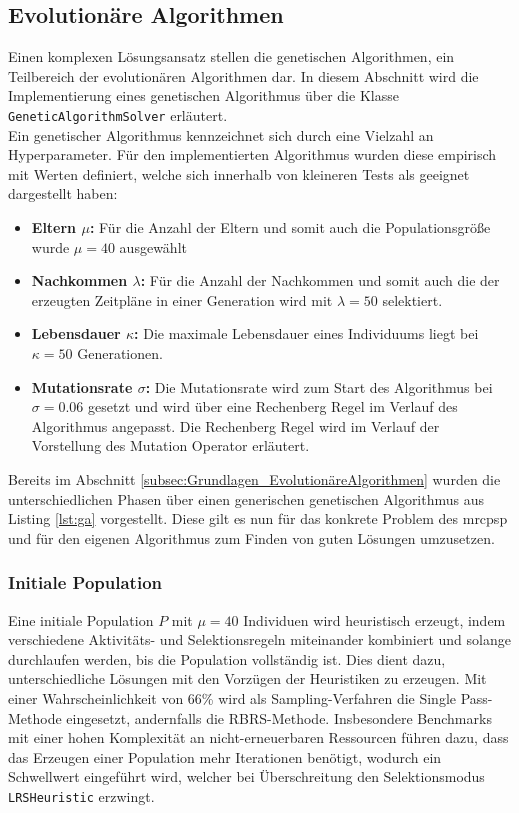 \subsection{Evolutionäre Algorithmen} \label{subsec:MetaheuristischeAlgorithmen_EvolutionaereAlgorithmen}

Einen komplexen Lösungsansatz stellen die genetischen Algorithmen, ein Teilbereich der evolutionären Algorithmen dar. In diesem Abschnitt wird die Implementierung eines genetischen Algorithmus über die Klasse \lstinline|GeneticAlgorithmSolver| erläutert. \\

Ein genetischer Algorithmus kennzeichnet sich durch eine Vielzahl an Hyperparameter. Für den implementierten Algorithmus wurden diese empirisch mit Werten definiert, welche sich innerhalb von kleineren Tests als geeignet dargestellt haben: 

\begin{itemize}
    \item \textbf{Eltern $\mu$: } Für die Anzahl der Eltern und somit auch die Populationsgröße wurde  $\mu = 40$ ausgewählt
    \item \textbf{Nachkommen $\lambda$: } Für die Anzahl der Nachkommen und somit auch die der erzeugten Zeitpläne in einer Generation wird mit $\lambda = 50$ selektiert. 
    \item \textbf{Lebensdauer $\kappa$: } Die maximale Lebensdauer eines Individuums liegt bei $\kappa = 50$ Generationen. 
    \item \textbf{Mutationsrate $\sigma$: } Die Mutationsrate wird zum Start des Algorithmus bei $\sigma = 0.06$ gesetzt und wird über eine Rechenberg Regel im Verlauf des Algorithmus angepasst. Die Rechenberg Regel wird im Verlauf der Vorstellung des Mutation Operator erläutert.
    
\end{itemize}

Bereits im Abschnitt \ref{subsec:Grundlagen_EvolutionäreAlgorithmen} wurden die unterschiedlichen Phasen über einen generischen genetischen Algorithmus aus Listing \ref{lst:ga} vorgestellt. Diese gilt es nun für das konkrete Problem des \ac{mrcpsp} und für den eigenen Algorithmus zum Finden von guten Lösungen umzusetzen.

\subsubsection*{Initiale Population}
Eine initiale Population $P$ mit $\mu = 40$ Individuen wird heuristisch erzeugt, indem verschiedene Aktivitäts- und Selektionsregeln miteinander kombiniert und solange durchlaufen werden, bis die Population vollständig ist. Dies dient dazu, unterschiedliche Lösungen mit den Vorzügen der Heuristiken zu erzeugen. Mit einer Wahrscheinlichkeit von 66\% wird als Sampling-Verfahren die Single Pass-Methode eingesetzt, andernfalls die \ac{RBRS}-Methode. Insbesondere Benchmarks mit einer hohen Komplexität an nicht-erneuerbaren Ressourcen führen dazu, dass das Erzeugen einer Population mehr Iterationen benötigt, wodurch ein Schwellwert eingeführt wird, welcher bei Überschreitung den Selektionsmodus \lstinline|LRSHeuristic| erzwingt. 

